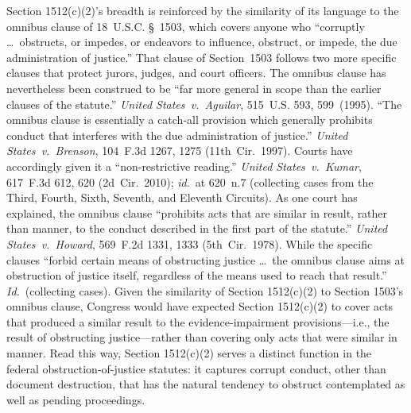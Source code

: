Section 1512(c)(2)'s breadth is reinforced by the similarity of its language to the omnibus clause of 18~U.S.C. \S~1503, which covers anyone who ``corruptly \dots\ obstructs, or impedes, or endeavors to influence, obstruct, or impede, the due administration of justice.'' That clause of Section~1503 follows two more specific clauses that protect jurors, judges, and court officers.
The omnibus clause has nevertheless been construed to be ``far more general in scope than the earlier clauses of the statute.''
\textit{United States~v.\ Aguilar}, 515~U.S. 593, 599~(1995).
``The omnibus clause is essentially a catch-all provision which generally prohibits conduct that interferes with the due administration of justice.''
\textit{United States~v.\ Brenson}, 104~F.3d 1267, 1275 (11th~Cir.~1997).
Courts have accordingly given it a ``non-restrictive reading.''
\textit{United States~v.\ Kumar}, 617~F.3d 612, 620 (2d~Cir.~2010); \textit{id}.~at 620~n.7 (collecting cases from the Third, Fourth, Sixth, Seventh, and Eleventh Circuits).
As one court has explained, the omnibus clause ``prohibits acts that are similar in result, rather than manner, to the conduct described in the first part of the statute.''
\textit{United States~v.\ Howard}, 569~F.2d 1331, 1333 (5th~Cir.~1978).
While the specific clauses ``forbid certain means of obstructing justice \dots\ the omnibus clause aims at obstruction of justice itself, regardless of the means used to reach that result.''
\textit{Id.}~(collecting cases).
Given the similarity of Section 1512(c)(2) to Section 1503's omnibus clause, Congress would have expected Section 1512(c)(2) to cover acts that produced a similar result to the evidence-impairment provisions---i.e., the result of obstructing justice---rather than covering only acts that were similar in manner.
Read this way, Section 1512(c)(2) serves a distinct function in the federal obstruction-of-justice statutes: it captures corrupt conduct, other than document destruction, that has the natural tendency to obstruct contemplated as well as pending proceedings.

